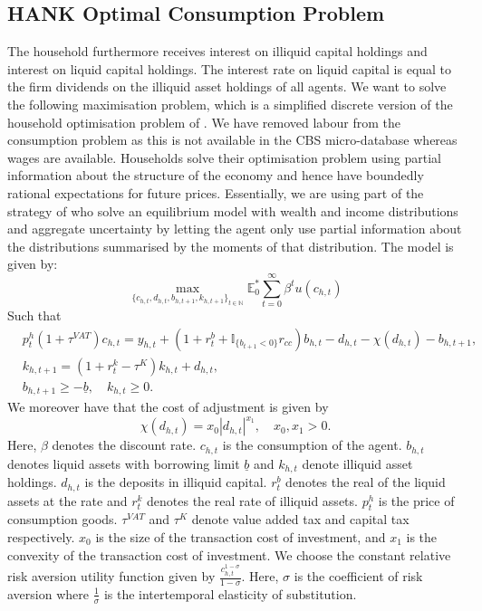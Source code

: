 \subsection{HANK Optimal Consumption Problem}
The household furthermore receives interest on illiquid capital holdings and interest on liquid capital holdings. The interest rate on liquid capital is equal to the firm dividends on the illiquid asset holdings of all agents.
We want to solve the following maximisation problem, which is a simplified discrete version of the household optimisation problem of \cite{kaplan_monetary_2018}. We have removed labour from the consumption problem as this is not available in the CBS micro-database whereas wages are available. Households solve their optimisation problem using partial information about the structure of the economy and hence have boundedly rational expectations for future prices. Essentially, we are using part of the strategy of \cite{krusell_income_1998} who solve an equilibrium model with wealth and income distributions and aggregate uncertainty by letting the agent only use partial information about the distributions summarised by the moments of that distribution. The model is given by:
\begin{equation}
\max _{\{c_{h,t}, d_{h,t}, b_{h,t+1},k_{h,t+1}\}_{t \in \mathbb{N}}} \mathbb{E}_0^* \sum_{t=0}^{\infty} \beta^t u(c_{h,t})
\end{equation}
Such that
\begin{equation}
\begin{aligned}
& p^h_t (1+\tau^{VAT})c_{h,t} = y_{h,t} +\left(1+r_t^b+\mathbb{I}_{\{b_{t+1}<0\}}r_{cc}\right) b_{h,t} -d_{h,t}-\chi(d_{h,t})-b_{h,t+1},\\
& k_{h,t+1}= \left(1+r^k_t-\tau^K\right) k_{h,t}+d_{h,t},\\
& b_{h,t+1}\geqslant -\underline{b}, \quad k_{h,t} \geqslant 0 . 
\end{aligned}
\end{equation}
We moreover have that the cost of adjustment is given by
\begin{equation}
    \chi(d_{h,t})=x_0|d_{h,t}|^{x_1}, \quad x_0, x_1>0.
\end{equation}
Here, $\beta$ denotes the discount rate. $c_{h,t}$ is the consumption of the agent. $b_{h,t}$ denotes liquid assets with borrowing limit $\underline{b}$ and $k_{h,t}$ denote illiquid asset holdings. $d_{h,t}$ is the deposits in illiquid capital. $r^b_t$ denotes the real of the liquid assets at the rate and $r^k_t$ denotes the real rate of illiquid assets. $p^h_t$ is the price of consumption goods. $\tau^{VAT}$ and $\tau^K$ denote value added tax and capital tax respectively. $x_0$ is the size of the transaction cost of investment, and $x_1$ is the convexity of the transaction cost of investment. We choose the constant relative risk aversion utility function given by $\frac{c_{h,t}^{1-\sigma}}{1-\sigma}$. Here, $\sigma$ is the coefficient of risk aversion where $\frac{1}{\sigma}$ is the intertemporal elasticity of substitution. \\

